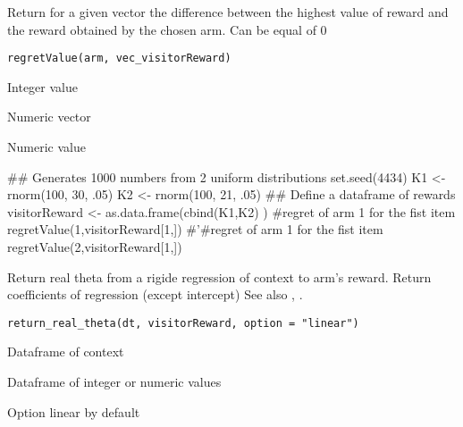 \documentclass[letterpaper]{book}
\begin{document}
%
\begin{Description}\relax
Return for a given vector the difference between
the highest value of reward and the reward obtained by the chosen arm.
Can be equal of 0
\end{Description}
%
\begin{Usage}
\begin{verbatim}
regretValue(arm, vec_visitorReward)
\end{verbatim}
\end{Usage}
%
\begin{Arguments}
\begin{ldescription}
\item[\code{arm}] Integer value

\item[\code{vec\_visitorReward}] Numeric vector
\end{ldescription}
\end{Arguments}
%
\begin{Value}
Numeric value
\end{Value}
%
\begin{Examples}
\begin{ExampleCode}
## Generates 1000 numbers from 2 uniform distributions
set.seed(4434)
K1 <- rnorm(100, 30, .05)
K2 <- rnorm(100, 21, .05)
## Define a dataframe of rewards
visitorReward <- as.data.frame(cbind(K1,K2) )
#regret of arm 1 for the fist item
regretValue(1,visitorReward[1,])
#'#regret of arm 1 for the fist item
regretValue(2,visitorReward[1,])
\end{ExampleCode}
\end{Examples}
%
\begin{Description}\relax
Return real theta from a rigide regression of context to arm's reward.
Return coefficients of regression (except intercept)
See also , .
\end{Description}
%
\begin{Usage}
\begin{verbatim}
return_real_theta(dt, visitorReward, option = "linear")
\end{verbatim}
\end{Usage}
%
\begin{Arguments}
\begin{ldescription}
\item[\code{dt}] Dataframe of context

\item[\code{visitorReward}] Dataframe of integer or numeric values

\item[\code{option}] Option linear by default
\end{ldescription}
\end{Arguments}
\end{document}
